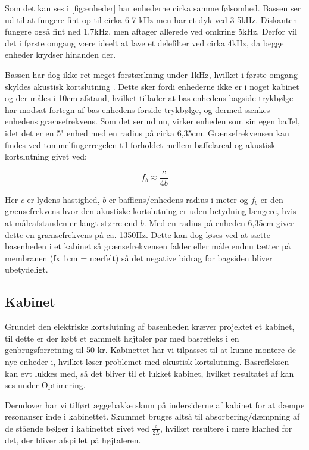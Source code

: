 Som det kan ses i \autoref{fig:enheder} har enhederne cirka samme følsomhed. Bassen ser ud til at fungere fint op til cirka 6-7 kHz men har et dyk ved 3-5kHz. Diskanten fungere også fint ned 1,7kHz, men aftager allerede ved omkring 5kHz. Derfor vil det i første omgang være ideelt at lave et delefilter ved cirka 4kHz, da begge enheder krydser hinanden der. 

Bassen har dog ikke ret meget forstærkning under 1kHz, hvilket i første omgang skyldes akustisk kortslutning \cite[side 24]{Elektroakustik}. Dette sker fordi enhederne ikke er i noget kabinet og der måles i 10cm afstand, hvilket tillader at bas enhedens bagside trykbølge har modsat fortegn af bas enhedens forside trykbølge, og dermed sænkes enhedens grænsefrekvens. Som det ser ud nu, virker enheden som sin egen baffel, idet det er en 5" enhed med en radius på cirka 6,35cm. Grænsefrekvensen kan findes ved tommelfingerregelen til forholdet mellem baffelareal og akustisk kortslutning givet ved: \cite[side 44]{Elektroakustik}

\begin{equation}
f_b \approx \frac{c} {4 b} 
\end{equation}

Her $c$ er lydens hastighed, $b$ er bafflens/enhedens radius i meter og $f_b$ er den grænsefrekvens hvor den akustiske kortslutning er uden betydning længere, hvis at måleafstanden er langt større end $b$. Med en radius på enheden 6,35cm giver dette en grænsefrekvens på ca. 1350Hz. Dette kan dog løses ved at sætte basenheden i et kabinet så grænsefrekvensen falder eller måle endnu tætter på membranen (fx 1cm = nærfelt) så det negative bidrag for bagsiden bliver ubetydeligt. 

\subsection{Kabinet}
Grundet den elektriske kortslutning af basenheden kræver projektet et kabinet, til dette er der købt et gammelt højtaler par med basrefleks i en genbrugsforretning til 50 kr. Kabinettet har vi tilpasset til at kunne montere de nye enheder i, hvilket løser problemet med akustisk kortslutning. Basrefleksen kan evt lukkes med, så det bliver til et lukket kabinet, hvilket resultatet af kan ses under Optimering.

Derudover har vi tilført æggebakke skum på indersiderne af kabinet for at dæmpe resonanser inde i kabinettet. Skummet bruges altså til absorbering/dæmpning af de stående bølger i kabinettet givet ved $ \frac{c}{2L} $, hvilket resultere i mere klarhed for det, der bliver afspillet på højtaleren.

